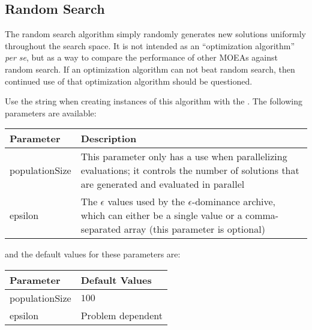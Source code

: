 \subsection{Random Search}
The random search algorithm simply randomly generates new solutions uniformly throughout the search space.  It is not intended as an ``optimization algorithm'' \emph{per se}, but as a way to compare the performance of other MOEAs against random search.  If an optimization algorithm can not beat random search, then continued use of that optimization algorithm should be questioned.

Use the string  when creating instances of this algorithm with the .  The following parameters are available:
\newline
\newline
\begin{tabularx}{\linewidth}{lX}
  \hline
  Parameter & Description \\
  \hline
  populationSize & This parameter only has a use when parallelizing evaluations; it controls the number of solutions that are generated and evaluated in parallel \\
  epsilon & The $\epsilon$ values used by the $\epsilon$-dominance archive, which can either be a single value or a comma-separated array (this parameter is optional) \\
  \hline
\end{tabularx}
\newline
\newline
and the default values for these parameters are:
\newline
\newline
\begin{tabularx}{\linewidth}{lX}
  \hline
  Parameter & Default Values \\
  \hline
  populationSize & $100$ \\
  epsilon & Problem dependent \\
  \hline
\end{tabularx}

